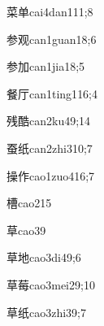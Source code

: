 \begin{verbete}{菜单}{cai4dan1}{11;8}
\end{verbete}

\begin{verbete}{参观}{can1guan1}{8;6}
\end{verbete}

\begin{verbete}{参加}{can1jia1}{8;5}
\end{verbete}

\begin{verbete}{餐厅}{can1ting1}{16;4}
\end{verbete}

\begin{verbete}{残酷}{can2ku4}{9;14}
\end{verbete}

\begin{verbete}{蚕纸}{can2zhi3}{10;7}
\end{verbete}

\begin{verbete}{操作}{cao1zuo4}{16;7}
\end{verbete}

\begin{verbete}{槽}{cao2}{15}
\end{verbete}

\begin{verbete}{草}{cao3}{9}
\end{verbete}

\begin{verbete}{草地}{cao3di4}{9;6}
\end{verbete}

\begin{verbete}{草莓}{cao3mei2}{9;10}
\end{verbete}

\begin{verbete}{草纸}{cao3zhi3}{9;7}
\end{verbete}

